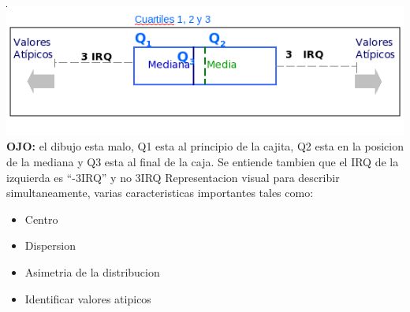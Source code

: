 \includegraphics[scale=0.5]{images/boxplot}\\
\textbf{OJO:} el dibujo esta malo, Q1 esta al principio de la cajita, Q2 esta en la posicion de la mediana y Q3 esta al final de la caja.
Se entiende tambien que el IRQ de la izquierda es ``-3IRQ'' y no 3IRQ
Representacion visual para describir simultaneamente, varias caracteristicas importantes tales como:
\begin{itemize}
\item Centro
\item Dispersion
\item Asimetria de la distribucion
\item Identificar valores atipicos
\end{itemize}
